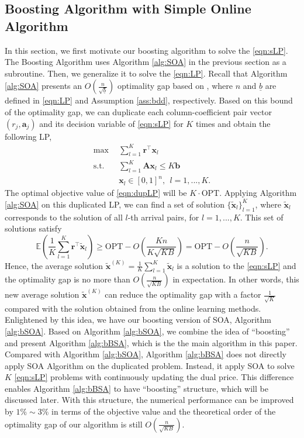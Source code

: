 \documentclass{article} %
\begin{document}
\subsection{Boosting Algorithm with Simple Online Algorithm}
\label{sec:boost}
In this section, we first motivate our boosting algorithm to solve the \eqref{eqn:sLP}. The Boosting Algorithm uses Algorithm \ref{alg:SOA} in the previous section as a subroutine. Then, we generalize it to solve the \eqref{eqn:LP}. Recall that Algorithm \ref{alg:SOA} presents an $O\left(\frac{n}{\sqrt{\underline{b}}}\right)$ optimality gap based on \cite{li2020simple}, where $n$ and $\underline{b}$ are defined in \eqref{eqn:LP} and Assumption \ref{ass:bdd}, respectively. Based on this bound of the optimality gap, we can duplicate each column-coefficient pair vector $(r_j,\bm{a}_j)$ and its decision variable of \eqref{eqn:sLP} for $K$ times and obtain the following LP,
\begin{align}
   \tag{dupLP} \max \ \ & \sum\limits_{l=1}^{K}\bm{r}^\top \bm{x}_{l} \label{eqn:dupLP}  \\
    \text{s.t. }\ & \sum\limits_{l=1}^{K} \bm{A} \bm{x}_{l} \le K\bm{b} \nonumber  \\ 
    & \bm{x}_{l} \in [0,1]^{n}, \ \ l=1,...,K \nonumber.
\end{align}
The optimal objective value of \eqref{eqn:dupLP} will be $K\cdot\text{OPT}$. Applying Algorithm \ref{alg:SOA} on this duplicated LP, we can find a set of solution $\{\tilde{\bm{x}}_{l}\}_{l=1}^{K}$, where $\tilde{\bm{x}}_l$ corresponds to the solution of all $l$-th arrival pairs, for $l=1,...,K$. This set of solutions satisfy
$$
    \mathbb{E}\left(\frac{1}{K}\sum\limits_{l=1}^{K}\bm{r}^{\top}\tilde{\bm{x}}_l\right)
    \geq 
    \text{OPT} - O\left(\frac{Kn}{K\sqrt{KB}}\right) 
    =
    \text{OPT} - O\left(\frac{n}{\sqrt{KB}}\right). 
$$
Hence, the average solution $\tilde{\bm{x}}^{(K)}=\frac{1}{K}\sum\limits_{l=1}^{K}\tilde{\bm{x}}_l$ is a solution to the \eqref{eqn:sLP} and the optimality gap is no more than $O\left(\frac{n}{\sqrt{KB}}\right)$ in expectation. In other words, this new average solution $\tilde{\bm{x}}^{(K)}$ can reduce the optimality gap with a factor $\frac{1}{\sqrt{K}}$ compared with the solution obtained from the online learning methods. Enlightened by this idea, we have our boosting version of SOA, Algorithm \ref{alg:bSOA}. Based on Algorithm \ref{alg:bSOA}, we combine the idea of ``boosting'' and present Algorithm \ref{alg:bBSA}, which is the the main algorithm in this paper. Compared with Algorithm \ref{alg:bSOA},  Algorithm \ref{alg:bBSA} does not directly apply SOA Algorithm on the duplicated problem. Instead, it apply SOA to solve $K$ \ref{eqn:sLP} problems with continuously updating the dual price. This difference enables Algorithm \ref{alg:bBSA} to have ``boosting''  structure, which will be discussed later. With this structure, the numerical performance can be improved by $1\% \sim 3\%$ in terms of the objective value and the theoretical order of the optimality gap of our algorithm is still $O(\frac{n}{\sqrt{KB}})$.
\end{document}
